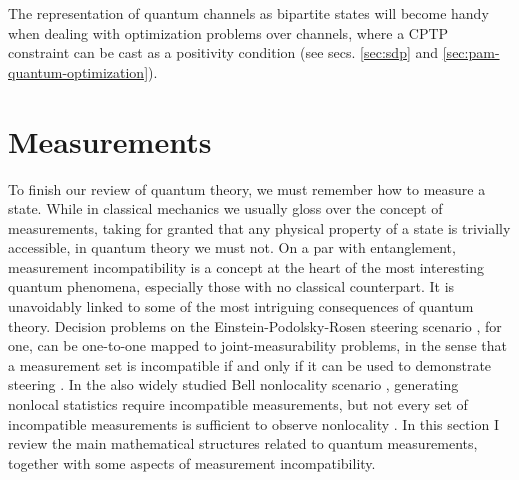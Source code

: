 		The representation of quantum channels as bipartite states will become handy when dealing with optimization problems over channels, where a CPTP constraint can be cast as a positivity condition (see secs. \ref{sec:sdp} and \ref{sec:pam-quantum-optimization}).
		

	\section{Measurements}
	\label{sec:measurements}
	
		To finish our review of quantum theory, we must remember how to measure a state. While in classical mechanics we usually gloss over the concept of measurements, taking for granted that any physical property of a state is trivially accessible, in quantum theory we must not. On a par with entanglement, measurement incompatibility is a concept at the heart of the most interesting quantum phenomena, especially those with no classical counterpart. It is unavoidably linked to some of the most intriguing consequences of quantum theory. Decision problems on the Einstein-Podolsky-Rosen steering scenario \cite{uola_2020_steering,cavalcanti_2016_steering}, for one, can be one-to-one mapped to joint-measurability problems, in the sense that a measurement set is incompatible if and only if it can be used to demonstrate steering \cite{quintino_incompatibilitysteering_2014,uola_incompatibilitysteering_2014,uola_onetoonesteering_2015}. In the also widely studied Bell nonlocality scenario \cite{brunner_2014_nonlocality}, generating nonlocal statistics require incompatible measurements, but not every set of incompatible measurements is sufficient to observe nonlocality \cite{quintino_2016_incompatibilitybell,quintino_2018_incompatibilitybellgeneral,bene_2018_incompatibilitybell}. In this section I review the main mathematical structures related to quantum measurements, together with some aspects of measurement incompatibility.
	
		\ornamentbreak

